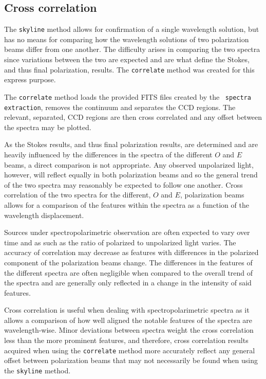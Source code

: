 \subsection{Cross correlation}


The \texttt{skyline} method allows for confirmation of a single wavelength solution, but has no means for comparing how the wavelength solutions of two polarization beams differ from one another. The difficulty arises in comparing the two spectra since variations between the two are expected and are what define the Stokes, and thus final polarization, results. The \texttt{correlate} method was created for this express purpose.

The \texttt{correlate} method loads the provided \gls{FITS} files created by the \polsalt\ \texttt{spectra extraction}, removes the continuum and separates the \gls{CCD} regions. The relevant, separated, \gls{CCD} regions are then cross correlated and any offset between the spectra may be plotted.

As the Stokes results, and thus final polarization results, are determined and are heavily influenced by the differences in the spectra of the different $O$ and $E$ beams, a direct comparison is not appropriate. Any observed unpolarized light, however, will reflect equally in both polarization beams and so the general trend of the two spectra may reasonably be expected to follow one another. Cross correlation of the two spectra for the different, $O$ and $E$, polarization beams allows for a comparison of the features within the spectra as a function of the wavelength displacement.

Sources under spectropolarimetric observation are often expected to vary over time and as such as the ratio of polarized to unpolarized light varies. The accuracy of correlation may decrease as features with differences in the polarized component of the polarization beams change. The differences in the features of the different spectra are often negligible when compared to the overall trend of the spectra and are generally only reflected in a change in the intensity of said features.

Cross correlation is useful when dealing with spectropolarimetric spectra as it allows a comparison of how well aligned the notable features of the spectra are wavelength-wise. Minor deviations between spectra weight the cross correlation less than the more prominent features, and therefore, cross correlation results acquired when using the \texttt{correlate} method more accurately reflect any general offset between polarization beams that may not necessarily be found when using the \texttt{skyline} method.

